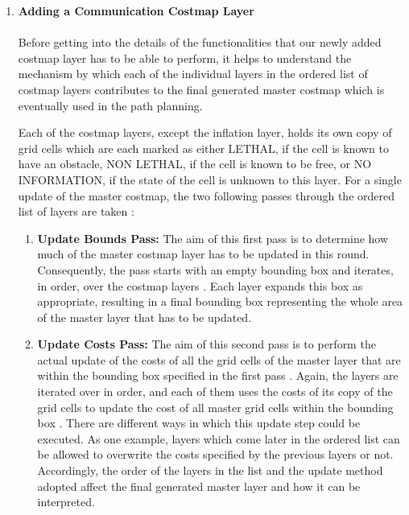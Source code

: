\begin{enumerate}
    \item \textbf{Adding a Communication Costmap Layer}
    \\ \\
    Before getting into the details of the functionalities that our newly added costmap layer has to be able to perform, it helps to understand the mechanism by which each of the individual layers in the ordered list of costmap layers contributes to the final generated master costmap which is eventually used in the path planning.

    Each of the costmap layers, except the inflation layer, holds its own copy of grid cells which are each marked as either LETHAL, if the cell is known to have an obstacle, NON LETHAL, if the cell is known to be free, or NO INFORMATION, if the state of the cell is unknown to this layer. For a single update of the master costmap, the two following passes through the ordered list of layers are taken \cite{costmap}:
    
    \begin{enumerate}
        \item \textbf{Update Bounds Pass:}
        The aim of this first pass is to determine how much of the master costmap layer has to be updated in this round. Consequently, the pass starts with an empty bounding box and iterates, in order, over the costmap layers \cite{costmap}. Each layer expands this box as appropriate, resulting in a final bounding box representing the whole area of the master layer that has to be updated.
        \item \textbf{Update Costs Pass:}
        The aim of this second pass is to perform the actual update of the costs of all the grid cells of the master layer that are within the bounding box specified in the first pass \cite{costmap}. Again, the layers are iterated over in order, and each of them uses the costs of its copy of the grid cells to update the cost of all master grid cells within the bounding box \cite{costmap}. There are different ways in which this update step could be executed. As one example, layers which come later in the ordered list can be allowed to overwrite the costs specified by the previous layers or not. Accordingly, the order of the layers in the list and the update method adopted affect the final generated master layer and how it can be interpreted.
    \end{enumerate}
    

\end{enumerate}
